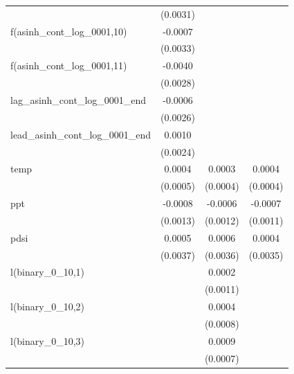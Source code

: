 \begin{tabular}{lccc}
                                          & (0.0031) &                       &   \\   
   f(asinh\_cont\_log\_0001,10)           & -0.0007  &                       &   \\   
                                          & (0.0033) &                       &   \\   
   f(asinh\_cont\_log\_0001,11)           & -0.0040  &                       &   \\   
                                          & (0.0028) &                       &   \\   
   lag\_asinh\_cont\_log\_0001\_end       & -0.0006  &                       &   \\   
                                          & (0.0026) &                       &   \\   
   lead\_asinh\_cont\_log\_0001\_end      & 0.0010   &                       &   \\   
                                          & (0.0024) &                       &   \\   
   temp                                   & 0.0004   & 0.0003                & 0.0004\\   
                                          & (0.0005) & (0.0004)              & (0.0004)\\   
   ppt                                    & -0.0008  & -0.0006               & -0.0007\\   
                                          & (0.0013) & (0.0012)              & (0.0011)\\   
   pdsi                                   & 0.0005   & 0.0006                & 0.0004\\   
                                          & (0.0037) & (0.0036)              & (0.0035)\\   
   l(binary\_0\_10,1)                     &          & 0.0002                &   \\   
                                          &          & (0.0011)              &   \\   
   l(binary\_0\_10,2)                     &          & 0.0004                &   \\   
                                          &          & (0.0008)              &   \\   
   l(binary\_0\_10,3)                     &          & 0.0009                &   \\   
                                          &          & (0.0007)              &   \\   

\end{tabular}
